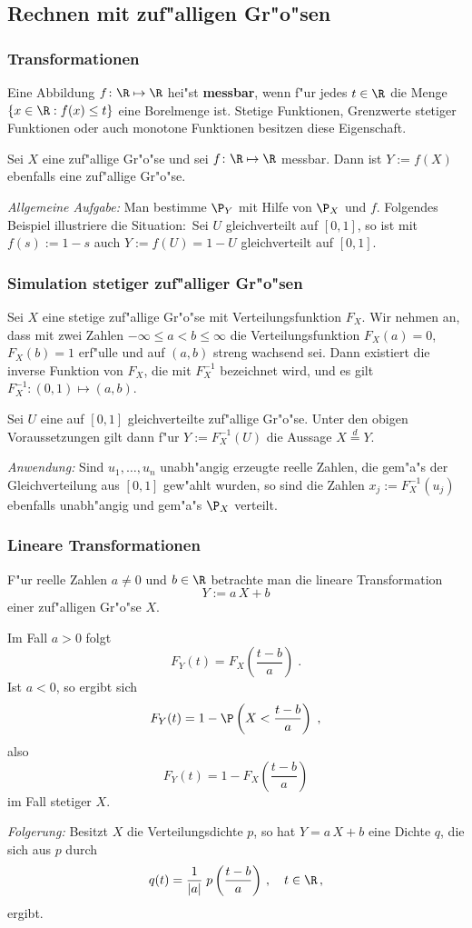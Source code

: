 \subsection{Rechnen mit zuf"alligen Gr"o"sen}
\subsubsection{Transformationen}
Eine Abbildung $f\colon\R\mapsto\R$ hei"st \textbf{messbar}, wenn f"ur jedes $t\in\R$ die
Menge $\{x\in \R : f(x)\le t\}$ eine Borelmenge ist. Stetige Funktionen, Grenzwerte stetiger
Funktionen oder auch monotone Funktionen besitzen diese Eigenschaft.
\begin{thm}
Sei $X$ eine zuf"allige Gr"o"se und sei $f\colon\R\mapsto\R$ messbar. Dann ist $Y:=f(X)$ ebenfalls
eine zuf"allige Gr"o"se.
\end{thm}
\textit{Allgemeine Aufgabe:} Man bestimme $\P_Y$ mit Hilfe von $\P_X$ und $f$.
Folgendes Beispiel illustriere die Situation$\colon$ Sei $U$ gleichverteilt auf $[0,1]$, so ist mit
$f(s):=1-s$ auch $Y:=f(U)=1-U$ gleichverteilt auf $[0,1]$.
\subsubsection{Simulation stetiger zuf"alliger Gr"o"sen}
Sei $X$ eine stetige zuf"allige Gr"o"se mit Verteilungsfunktion $F_X$. Wir nehmen an,
dass mit zwei Zahlen
$-\infty\le a<b\le\infty$ die Verteilungsfunktion $F_X(a)=0$, $F_X(b)=1$ erf"ulle  und
auf $(a,b)$ streng wachsend sei. Dann
existiert die inverse Funktion von $F_X$, die mit $F_X^{-1}$ bezeichnet wird, und es
gilt $F_X^{-1}\colon(0,1)\mapsto (a,b)$.
\begin{thm}
Sei $U$ eine auf $[0,1]$ gleichverteilte zuf"allige Gr"o"se. Unter den
obigen Voraussetzungen gilt dann f"ur $Y:=F_X^{-1}(U)$ die Aussage
$X\stackrel{d}{=} Y$.
\end{thm}
\textit{Anwendung:} Sind $u_1,\ldots,u_n$ unabh"angig erzeugte reelle Zahlen, die gem"a"s der
Gleichverteilung aus $[0,1]$ gew"ahlt wurden, so sind die Zahlen $x_j:= F_X^{-1}(u_j)$ ebenfalls unabh"angig
und gem"a"s $\P_X$ verteilt.
\subsubsection{Lineare Transformationen}
F"ur reelle Zahlen $a\not=0$ und $b\in\R$ betrachte man die lineare Transformation
$$
Y:=a\,X+ b
$$
einer zuf"alligen Gr"o"se $X$.
\begin{thm}
Im Fall $a>0$ folgt
$$
F_Y(t)=F_X\left(\frac{t-b}{a}\right)\;.
$$
Ist $a<0$, so ergibt sich
$$
F_Y(t)=1-\P\left(X<\frac{t-b}{a}\right)\;,
$$
also
$$
F_Y(t)=1-F_X\left(\frac{t-b}{a}\right)
$$
im Fall stetiger $X$.
\end{thm}
\textit{Folgerung:} Besitzt $X$ die Verteilungsdichte $p$, so hat $Y=a\,X+b$ eine Dichte $q$,
die sich aus $p$ durch
$$
q(t)=\frac{1}{|a|}\;p\left(\frac{t-b}{a}\right)\,,\quad t\in\R\,,
$$
ergibt.
